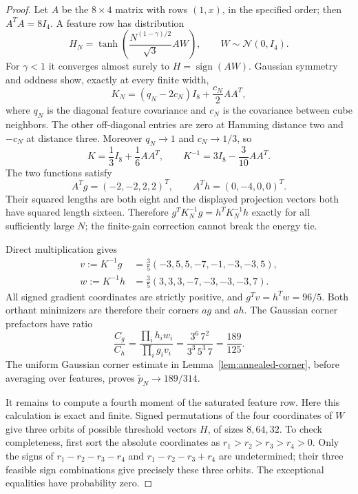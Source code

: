 \begin{proof}
Let $A$ be the $8\times4$ matrix with rows $(1,x)$, in the specified
order; then $A^TA=8I_4$. A feature row has distribution
\[
 H_N=\tanh\left(\frac{N^{(1-\gamma)/2}}{\sqrt3}AW\right),
                 \qquad W\sim\mathcal N(0,I_4).
\]
For $\gamma<1$ it converges almost surely to $H=\operatorname{sign}(AW)$.
Gaussian symmetry and oddness show, exactly at every finite width,
\[
 K_N=(q_N-2c_N)I_8+\frac{c_N}{2}AA^T,
\]
where $q_N$ is the diagonal feature covariance and $c_N$ is the
covariance between cube neighbors. The other off-diagonal entries are
zero at Hamming distance two and $-c_N$ at distance three. Moreover
$q_N\to1$ and $c_N\to1/3$, so
\[
 K=\frac13I_8+\frac16AA^T,\qquad
 K^{-1}=3I_8-\frac3{10}AA^T.
\]
The two functions satisfy
\[
 A^Tg=(-2,-2,2,2)^T,\qquad A^Th=(0,-4,0,0)^T.
\]
Their squared lengths are both eight and the displayed projection
vectors both have squared length sixteen. Therefore
$g^TK_N^{-1}g=h^TK_N^{-1}h$ exactly for all sufficiently large $N$;
the finite-gain correction cannot break the energy tie.

Direct multiplication gives
\begin{align*}
 v:=K^{-1}g&=\frac35(-3,5,5,-7,-1,-3,-3,5),\\
 w:=K^{-1}h&=\frac35(3,3,3,-7,-3,-3,-3,7).
\end{align*}
All signed gradient coordinates are strictly positive, and
$g^Tv=h^Tw=96/5$. Both orthant minimizers are therefore their corners
$ag$ and $ah$. The Gaussian corner prefactors have ratio
\[
 \frac{C_g}{C_h}
 =\frac{\prod_i h_i w_i}{\prod_i g_i v_i}
 =\frac{3^6\,7^2}{3^3\,5^3\,7}=\frac{189}{125}.
\]
The uniform Gaussian corner estimate in
Lemma~\ref{lem:annealed-corner}, before averaging over features, proves
$\widetilde p_N\to189/314$.

It remains to compute a fourth moment of the saturated feature row.
Here this calculation is exact and finite. Signed permutations of the
four coordinates of $W$ give three orbits of possible threshold
vectors $H$, of sizes $8,64,32$. To check completeness, first sort the
absolute coordinates as $r_1>r_2>r_3>r_4>0$. Only the signs of
$r_1-r_2-r_3-r_4$ and $r_1-r_2-r_3+r_4$ are undetermined; their
three feasible sign combinations give precisely these three orbits.
The exceptional equalities have probability zero.


\end{proof}
